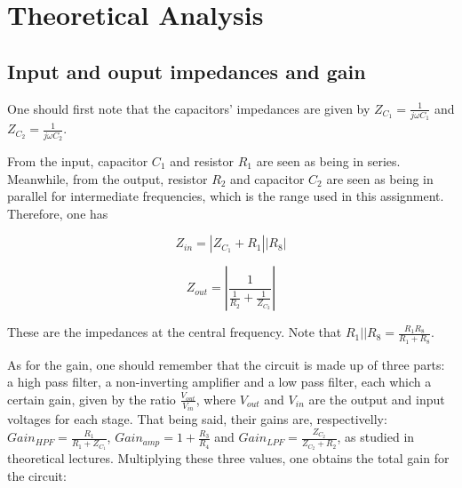 \section{Theoretical Analysis}
\label{sec:analysis}



\subsection{Input and ouput impedances and gain}

One should first note that the capacitors' impedances are given by $Z_{C_1} = \frac{1}{j \omega C_1}$ and $Z_{C_2} = \frac{1}{j \omega C_2}$.



From the input, capacitor $C_1$ and resistor $R_1$ are seen as being in series. Meanwhile, from the output, resistor $R_2$ and capacitor $C_2$ are seen as being in parallel for intermediate frequencies, which is the range used in this assignment. Therefore, one has

\begin{equation}
Z_{in} = |Z_{C_1} + R_1||R_8|
\end{equation}

\begin{equation}
Z_{out} = \left|\frac{1}{\frac{1}{R_2} + \frac{1}{Z_{C_2}}}\right|
\end{equation}

These are the impedances at the central frequency. Note that $R_1||R_8 = \frac{R_1 R_8}{R_1 + R_8}$.




As for the gain, one should remember that the circuit is made up of three parts: a high pass filter, a non-inverting amplifier and a low pass filter, each which a certain gain, given by the ratio $\frac{V_{out}}{V_{in}}$, where $V_{out}$ and $V_{in}$ are the output and input voltages for each stage. That being said, their gains are, respectivelly: $Gain_{HPF} = \frac{R_1}{R_1 + Z_{C_1}}$, $Gain_{amp} = 1+\frac{R_3}{R_4}$ and $Gain_{LPF} = \frac{Z_{C_2}}{Z_{C_2}+R_2}$, as studied in theoretical lectures. Multiplying these three values, one obtains the total gain for the circuit:

